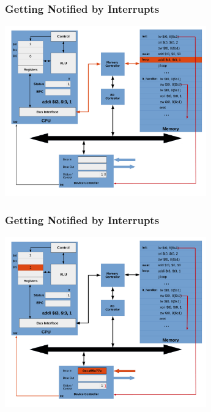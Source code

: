 \documentclass{beamer}
\begin{document}
\begin{frame}[fragile]
\frametitle{Getting Notified by Interrupts}

\begin{center}
\vspace*{-0.23cm}
\hspace*{-1cm}\includegraphics[width=8.7cm]{interrupt_waiting10.pdf}
\end{center}

\end{frame}

\begin{frame}[fragile]
\frametitle{Getting Notified by Interrupts}

\begin{center}
\vspace*{-0.23cm}
\hspace*{-1cm}\includegraphics[width=8.7cm]{interrupt_waiting11.pdf}
\end{center}

\end{frame}
\end{document}
